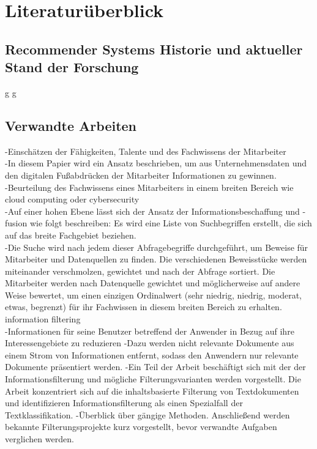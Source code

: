 \chapter{Literaturüberblick}
\label{chap:literaturüberblick}

\section{Recommender Systems Historie und aktueller Stand der Forschung}
\cite{dong2022brief}
\cite{burke2011recommender}

\cite{chartron2014general}

\cite{ricci2014recommender}

g
\newpage
g
\newpage

\section{Verwandte Arbeiten}

-Einschätzen der Fähigkeiten, Talente und des Fachwissens der Mitarbeiter\\
-In diesem Papier wird ein Ansatz beschrieben, um aus Unternehmensdaten und den digitalen Fußabdrücken der Mitarbeiter Informationen zu gewinnen.\\
-Beurteilung des Fachwissens eines Mitarbeiters in einem breiten Bereich wie cloud computing oder cybersecurity\\
-Auf einer hohen Ebene lässt sich der Ansatz der Informationsbeschaffung und -fusion wie folgt beschreiben: Es wird eine Liste von Suchbegriffen erstellt, die sich auf das breite Fachgebiet beziehen.\\
-Die Suche wird nach jedem dieser Abfragebegriffe durchgeführt, um Beweise für Mitarbeiter und Datenquellen zu finden. Die verschiedenen Beweisstücke werden miteinander verschmolzen, gewichtet und nach der Abfrage sortiert. Die Mitarbeiter werden nach Datenquelle gewichtet und möglicherweise auf andere Weise bewertet, um einen einzigen Ordinalwert (sehr niedrig, niedrig, moderat, etwas, begrenzt) für ihr Fachwissen in diesem breiten Bereich zu erhalten.\cite{horesh2016information} \\

information filtering\\
-Informationen für seine Benutzer betreffend der Anwender in Bezug auf ihre Interessengebiete zu reduzieren
-Dazu werden nicht relevante Dokumente aus einem Strom von Informationen entfernt, sodass den Anwendern nur relevante Dokumente präsentiert werden.
-Ein Teil der Arbeit beschäftigt sich mit der der Informationsfilterung und mögliche Filterungsvarianten werden vorgestellt. Die Arbeit konzentriert sich auf die inhaltsbasierte Filterung von Textdokumenten und identifizieren Informationsfilterung als einen Spezialfall der Textklassifikation.
-Überblick über gängige Methoden. Anschließend werden bekannte Filterungsprojekte kurz vorgestellt, bevor verwandte Aufgaben verglichen werden.
\cite{lanquillon2001enhancing}

